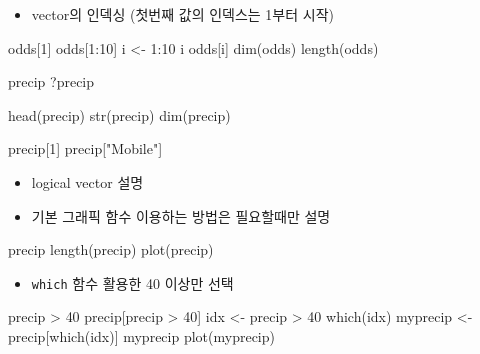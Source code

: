 \documentclass[
]{book}
\newenvironment{Shaded}{\begin{snugshade}}{\end{snugshade}}
\newcommand{\DecValTok}[1]{\textcolor[rgb]{0.00,0.00,0.81}{#1}}
\newcommand{\FunctionTok}[1]{\textcolor[rgb]{0.00,0.00,0.00}{#1}}
\newcommand{\NormalTok}[1]{#1}
\newcommand{\OtherTok}[1]{\textcolor[rgb]{0.56,0.35,0.01}{#1}}
\newcommand{\SpecialCharTok}[1]{\textcolor[rgb]{0.00,0.00,0.00}{#1}}
\newcommand{\StringTok}[1]{\textcolor[rgb]{0.31,0.60,0.02}{#1}}
\providecommand{\tightlist}{%
  \setlength{\itemsep}{0pt}\setlength{\parskip}{0pt}}
\begin{document}
\begin{itemize}
\tightlist
\item
  vector의 인덱싱 (첫번째 값의 인덱스는 1부터 시작)
\end{itemize}

\begin{Shaded}
\begin{Highlighting}[]

\NormalTok{odds[}\DecValTok{1}\NormalTok{]}
\NormalTok{odds[}\DecValTok{1}\SpecialCharTok{:}\DecValTok{10}\NormalTok{]}
\NormalTok{i }\OtherTok{\textless{}{-}} \DecValTok{1}\SpecialCharTok{:}\DecValTok{10}
\NormalTok{i}
\NormalTok{odds[i]}
\FunctionTok{dim}\NormalTok{(odds)}
\FunctionTok{length}\NormalTok{(odds)}
\end{Highlighting}
\end{Shaded}

\begin{Shaded}
\begin{Highlighting}[]
\NormalTok{precip}
\NormalTok{?precip}

\FunctionTok{head}\NormalTok{(precip)}
\FunctionTok{str}\NormalTok{(precip)}
\FunctionTok{dim}\NormalTok{(precip)}

\NormalTok{precip[}\DecValTok{1}\NormalTok{]}
\NormalTok{precip[}\StringTok{"Mobile"}\NormalTok{]}
\end{Highlighting}
\end{Shaded}

\begin{itemize}
\tightlist
\item
  logical vector 설명
\item
  기본 그래픽 함수 이용하는 방법은 필요할때만 설명
\end{itemize}

\begin{Shaded}
\begin{Highlighting}[]
\NormalTok{precip}
\FunctionTok{length}\NormalTok{(precip)}
\FunctionTok{plot}\NormalTok{(precip)}
\end{Highlighting}
\end{Shaded}

\begin{itemize}
\tightlist
\item
  \texttt{which} 함수 활용한 40 이상만 선택
\end{itemize}

\begin{Shaded}
\begin{Highlighting}[]
\NormalTok{precip }\SpecialCharTok{\textgreater{}} \DecValTok{40}
\NormalTok{precip[precip }\SpecialCharTok{\textgreater{}} \DecValTok{40}\NormalTok{]}
\NormalTok{idx }\OtherTok{\textless{}{-}}\NormalTok{ precip }\SpecialCharTok{\textgreater{}} \DecValTok{40}
\FunctionTok{which}\NormalTok{(idx)}
\NormalTok{myprecip }\OtherTok{\textless{}{-}}\NormalTok{ precip[}\FunctionTok{which}\NormalTok{(idx)]}
\NormalTok{myprecip}
\FunctionTok{plot}\NormalTok{(myprecip)}
\end{Highlighting}
\end{Shaded}
\end{document}
